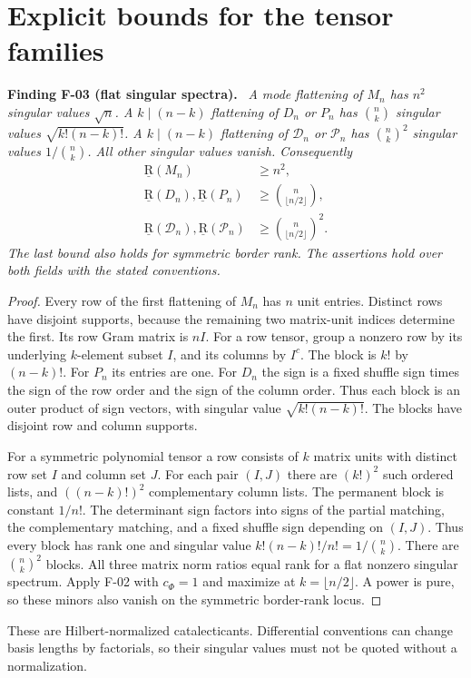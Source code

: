 \documentclass[11pt]{article}
\newcommand{\BR}{\underline{\mathrm R}}\newcommand{\TR}{\mathrm R}
\newenvironment{finding}[2]{\par\medskip\noindent\textbf{Finding #1 (#2).}\ \itshape}{\par\medskip}
\begin{document}
\section{Explicit bounds for the tensor families}
\begin{finding}{F-03}{flat singular spectra}
A mode flattening of $M_n$ has $n^2$ singular values $\sqrt n$.
A $k\mid(n-k)$ flattening of $D_n$ or $P_n$ has $\binom nk$
singular values $\sqrt{k!(n-k)!}$.
A $k\mid(n-k)$ flattening of $\mathcal D_n$ or $\mathcal P_n$
has $\binom nk^2$ singular values $1/\binom nk$.
All other singular values vanish. Consequently
\begin{align}
 \BR(M_n)&\geq n^2,\label{eq:MMbound}\\
 \BR(D_n),\BR(P_n)&\geq\binom n{\lfloor n/2\rfloor},\label{eq:rowbound}\\
 \BR(\mathcal D_n),\BR(\mathcal P_n)&\geq
          \binom n{\lfloor n/2\rfloor}^{\!2}.\label{eq:polybounds}
\end{align}
The last bound also holds for symmetric border rank. The assertions
hold over both fields with the stated conventions.
\end{finding}
\begin{proof}
Every row of the first flattening of $M_n$ has $n$ unit entries.
Distinct rows have disjoint supports, because the remaining two
matrix-unit indices determine the first. Its row Gram matrix is $nI$.
For a row tensor, group a nonzero row by its underlying $k$-element
subset $I$, and its columns by $I^c$. The block is $k!$ by
$(n-k)!$. For $P_n$ its entries are one. For $D_n$ the sign is
a fixed shuffle sign times the sign of the row order and the sign
of the column order. Thus each block is an outer product of sign
vectors, with singular value $\sqrt{k!(n-k)!}$.
The blocks have disjoint row and column supports.

For a symmetric polynomial tensor a row consists of $k$ matrix units
with distinct row set $I$ and column set $J$. For each pair $(I,J)$
there are $(k!)^2$ such ordered lists, and $((n-k)!)^2$
complementary column lists. The permanent block is constant $1/n!$.
The determinant sign factors into signs of the partial matching,
the complementary matching, and a fixed shuffle sign depending on
$(I,J)$. Thus every block has rank one and singular value
$k!(n-k)!/n!=1/\binom nk$. There are $\binom nk^2$ blocks.
All three matrix norm ratios equal rank for a flat nonzero singular
spectrum. Apply F-02 with $c_\Phi=1$ and maximize at
$k=\lfloor n/2\rfloor$. A power is pure, so these minors also
vanish on the symmetric border-rank locus.
\end{proof}
These are Hilbert-normalized catalecticants. Differential conventions
can change basis lengths by factorials, so their singular values must
not be quoted without a normalization.
\end{document}
